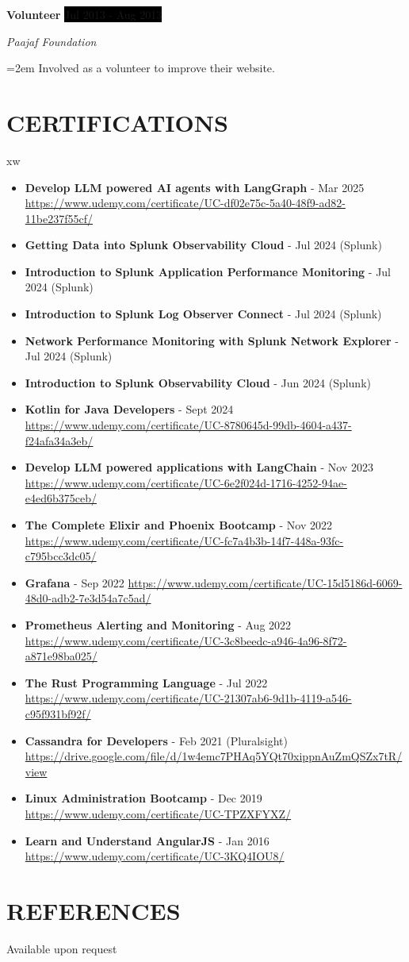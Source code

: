 \documentclass[paper=a4,fontsize=11pt]{scrartcl} %
\newcommand{\NewPart}[1]{\section*{\uppercase{#1}}}
\newcommand{\EducationEntry}[4]{
		\noindent \textbf{#1} \hfill      %
		\colorbox{Black}{%
			\parbox{6em}{%
			\hfill\color{White}#2}} \par  %
		\noindent \textit{#3} \par        %
		\noindent\hangindent=2em\hangafter=0 \small #4 %
		\normalsize \par}
\newcommand{\WorkEntry}[4]{				  %
		\noindent \textbf{#1} \hfill      %
		\colorbox{Black}{\color{White}#2} \par  %
		\noindent \textit{#3} \par              %
		\noindent\hangindent=2em\hangafter=0 \small #4 %
		\normalsize \par}
\begin{document}
\WorkEntry{Volunteer}{Jul 2013 - Aug 2013}{Paajaf Foundation}{Involved as a volunteer to improve their website.}


\NewPart{Certifications}{}xw

\begin{itemize}
\item \textbf{Develop LLM powered AI agents with LangGraph} - Mar 2025 \url{https://www.udemy.com/certificate/UC-df02e75c-5a40-48f9-ad82-11be237f55cf/}
\item \textbf{Getting Data into Splunk Observability Cloud} - Jul 2024 (Splunk)
\item \textbf{Introduction to Splunk Application Performance Monitoring} - Jul 2024 (Splunk)
\item \textbf{Introduction to Splunk Log Observer Connect} - Jul 2024 (Splunk)
\item \textbf{Network Performance Monitoring with Splunk Network Explorer} - Jul 2024 (Splunk)
\item \textbf{Introduction to Splunk Observability Cloud} - Jun 2024 (Splunk)
\item \textbf{Kotlin for Java Developers} - Sept 2024 \url{https://www.udemy.com/certificate/UC-8780645d-99db-4604-a437-f24afa34a3eb/}
\item \textbf{Develop LLM powered applications with LangChain} - Nov 2023 \url{https://www.udemy.com/certificate/UC-6e2f024d-1716-4252-94ae-e4ed6b375ceb/}
\item \textbf{The Complete Elixir and Phoenix Bootcamp} - Nov 2022 \url{https://www.udemy.com/certificate/UC-fc7a4b3b-14f7-448a-93fc-c795bcc3dc05/}
\item \textbf{Grafana} - Sep 2022 \url{https://www.udemy.com/certificate/UC-15d5186d-6069-48d0-adb2-7e3d54a7c5ad/}
\item \textbf{Prometheus Alerting and Monitoring} - Aug 2022 \url{https://www.udemy.com/certificate/UC-3c8beedc-a946-4a96-8f72-a871e98ba025/}
\item \textbf{The Rust Programming Language} - Jul 2022 \url{https://www.udemy.com/certificate/UC-21307ab6-9d1b-4119-a546-c95f931bf92f/}
\item \textbf{Cassandra for Developers} - Feb 2021 (Pluralsight) \url{https://drive.google.com/file/d/1w4emc7PHAq5YQt70xippnAuZmQSZx7tR/view}
\item \textbf{Linux Administration Bootcamp} - Dec 2019 \url{https://www.udemy.com/certificate/UC-TPZXFYXZ/}
\item \textbf{Learn and Understand AngularJS} - Jan 2016 \url{https://www.udemy.com/certificate/UC-3KQ4IOU8/}
\end{itemize}


\NewPart{References}{}
Available upon request
\end{document}
